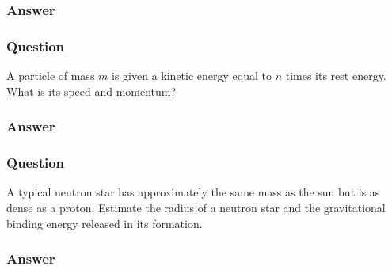 \subsubsection{Answer}


\subsubsection{Question}
A particle of mass $m$ is given a kinetic energy equal to $n$ times its rest energy. What is its speed and momentum?
\subsubsection{Answer}


\subsubsection{Question}
A typical neutron star has approximately the same mass as the sun but is as dense as a proton. Estimate the radius of a neutron star and the gravitational binding energy released in its formation.
\subsubsection{Answer}


